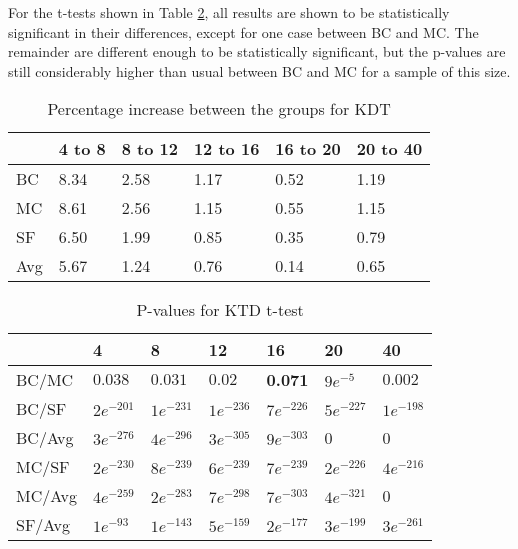 For the t-tests shown in Table \ref{tbl:ktd_ttest}, all results are shown to be statistically significant in their differences, except for one case between BC and MC. The remainder are different enough to be statistically significant, but the p-values are still considerably higher than usual between BC and MC for a sample of this size.
\begin{table}[H]
	\centering
	\begin{tabular}{|l|lllll|}\hline
		& 4 to 8 & 8 to 12 & 12 to 16 & 16 to 20 & 20 to 40 \\\hline
		BC 	& 8.34	& 2.58	& 1.17  & 0.52	& 1.19 \\
		MC  & 8.61 	& 2.56	& 1.15	& 0.55	& 1.15 \\
		SF  & 6.50	& 1.99	& 0.85	& 0.35	& 0.79 \\
		Avg	& 5.67	& 1.24 	& 0.76	& 0.14	& 0.65 \\ \hline
	\end{tabular}
	\caption{Percentage increase between the groups for KDT}
	\label{tbl:kendall}
\end{table}


\begin{table}[H]
	\centering
	\begin{tabular}{|l|llllll|}\hline
		& 4 & 8 & 12 & 16 & 20 & 40 \\\hline
		BC/MC	& $0.038$	& $0.031$	& $0.02$	& \textbf{0.071}	& $9e^{-5}$	& $0.002$ \\
		BC/SF	& $2e^{-201}$	& $1e^{-231}$	& $1e^{-236}$	& $7e^{-226}$ & $5e^{-227}$ & $1e^{-198}$ \\
		BC/Avg	& $3e^{-276}$	& $4e^{-296}$ 	& $3e^{-305}$	& $9e^{-303}$	& 0 & 0 \\
		MC/SF	& $2e^{-230}$	& $8e^{-239}$ 	& $6e^{-239}$	& $7e^{-239}$	& $2e^{-226}$ & $4e^{-216}$ \\
		MC/Avg	& $4e^{-259}$	& $2e^{-283}$ 	& $7e^{-298}$	& $7e^{-303}$ & $4e^{-321}$ & 0 \\
		SF/Avg	& $1e^{-93}$	& $1e^{-143}$ 	& $5e^{-159}$	& $2e^{-177}$	& $3e^{-199}$ & $3e^{-261}$ \\ \hline
	\end{tabular}
	\caption{P-values for KTD t-test}
	\label{tbl:ktd_ttest}
\end{table}